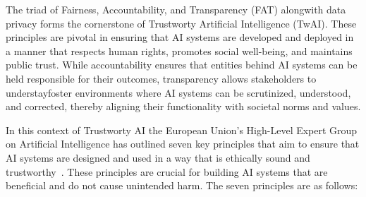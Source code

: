 The triad of Fairness, Accountability, and Transparency (FAT) alongwith data privacy forms the cornerstone of Trustworty Artificial Intelligence (TwAI). These principles are pivotal in ensuring that AI systems are developed and deployed in a manner that respects human rights, promotes social well-being, and maintains public trust. While accountability ensures that entities behind AI systems can be held responsible for their outcomes, transparency allows stakeholders to understayfoster environments where AI systems can be scrutinized, understood, and corrected, thereby aligning their functionality with societal norms and values. 

In this context of Trustworty AI the European Union's High-Level Expert Group on Artificial Intelligence has outlined seven key principles that aim to ensure that AI systems are designed and used in a way that is ethically sound and trustworthy~\citep{TwAI_Europe}. These principles are crucial for building AI systems that are beneficial and do not cause unintended harm. The seven principles are as follows:

